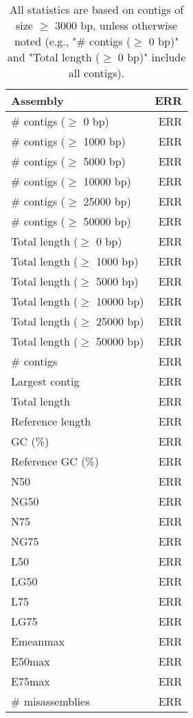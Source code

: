 \documentclass[12pt,a4paper]{article}
\begin{document}
\begin{table}[ht]
\begin{center}
\caption{All statistics are based on contigs of size $\geq$ 3000 bp, unless otherwise noted (e.g., "\# contigs ($\geq$ 0 bp)" and "Total length ($\geq$ 0 bp)" include all contigs).}
\begin{tabular}{|l*{1}{|r}|}
\hline
Assembly & ERR \\ \hline
\# contigs ($\geq$ 0 bp) & ERR \\ \hline
\# contigs ($\geq$ 1000 bp) & ERR \\ \hline
\# contigs ($\geq$ 5000 bp) & ERR \\ \hline
\# contigs ($\geq$ 10000 bp) & ERR \\ \hline
\# contigs ($\geq$ 25000 bp) & ERR \\ \hline
\# contigs ($\geq$ 50000 bp) & ERR \\ \hline
Total length ($\geq$ 0 bp) & ERR \\ \hline
Total length ($\geq$ 1000 bp) & ERR \\ \hline
Total length ($\geq$ 5000 bp) & ERR \\ \hline
Total length ($\geq$ 10000 bp) & ERR \\ \hline
Total length ($\geq$ 25000 bp) & ERR \\ \hline
Total length ($\geq$ 50000 bp) & ERR \\ \hline
\# contigs & ERR \\ \hline
Largest contig & ERR \\ \hline
Total length & ERR \\ \hline
Reference length & ERR \\ \hline
GC (\%) & ERR \\ \hline
Reference GC (\%) & ERR \\ \hline
N50 & ERR \\ \hline
NG50 & ERR \\ \hline
N75 & ERR \\ \hline
NG75 & ERR \\ \hline
L50 & ERR \\ \hline
LG50 & ERR \\ \hline
L75 & ERR \\ \hline
LG75 & ERR \\ \hline
Emeanmax & ERR \\ \hline
E50max & ERR \\ \hline
E75max & ERR \\ \hline
\# misassemblies & ERR \\ \hline

\end{tabular}
\end{center}
\end{table}
\end{document}
